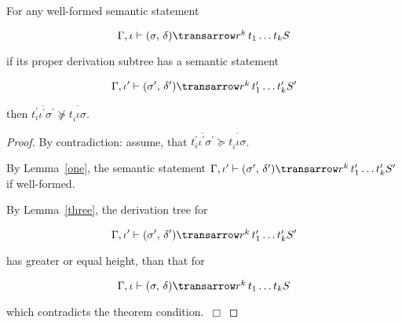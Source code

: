 \begin{theorem}
\normalfont
For any well-formed semantic statement 

$$
\otrans{\Gamma,\iota}{(\sigma,\,\delta)}{r^k\,t_1\dots t_k}{S}
$$ 

if its proper derivation subtree has a semantic statement 

$$
\otrans{\Gamma,\iota^\prime}{(\sigma^\prime,\,\delta^\prime)}{r^k\,t^\prime_1\dots t^\prime_k}{S^\prime}
$$

then \mbox{$\overline{t^\prime_i \iota^\prime \sigma^\prime} \not \succeq \overline{t^{\phantom{\prime}}_i \iota \sigma}$}. 
\end{theorem}
\begin{proof}
By contradiction: assume, that \mbox{$\overline{t^\prime_i \iota^\prime \sigma^\prime}\succeq \overline{t^{\phantom{\prime}}_i \iota \sigma}$}. 

By Lemma~\ref{one}, the semantic statement \mbox{$\otrans{\Gamma,\iota^\prime}{(\sigma^\prime,\,\delta^\prime)}{r^k\,t^\prime_1\dots t^\prime_k}{S^\prime}$} if
well-formed.

By Lemma~\ref{three}, the derivation tree for

$$
\otrans{\Gamma,\iota^\prime}{(\sigma^\prime,\,\delta^\prime)}{r^k\,t^\prime_1\dots t^\prime_k}{S^\prime}
$$

\noindent has greater or equal height, than that for

$$
\otrans{\Gamma,\iota}{(\sigma,\,\delta)}{r^k\,t_1\dots t_k}{S}
$$ 

\noindent which contradicts the theorem condition.~$\Box$
\end{proof} 
